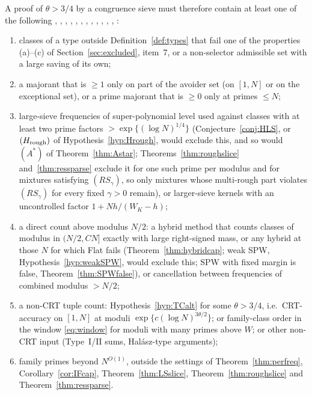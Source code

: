 \documentclass[10pt,reqno]{amsart}
\theoremstyle{definition}
\theoremstyle{remark}
\begin{document}
A proof of $\theta>3/4$ by a congruence sieve must therefore contain at
least one of the following \cite[\S6]{ET}, \cite[\S4.3]{KA},
\cite[\S6]{NC}, \cite[\S6]{KA2}, \cite[\S7]{LS}, \cite[\S0]{LS2},
\cite[\S0]{IF2}, \cite[\S0]{TU2}, \cite[\S5]{KA3}, \cite[\S4]{LS3}, \cite[\S5]{LS4},
\cite[\S4]{SPW}, \cite[\S1]{SPW2}:
\begin{enumerate}
\item[(i)] classes of a type outside Definition~\ref{def:types} that fail
  one of the properties (a)--(c) of Section~\ref{sec:excluded}, item~7,
  or a non-selector admissible set with a large saving of its own;
\item[(ii)] a majorant that is $\geq1$ only on part of the avoider set
  (on $[1,N]$ or on the exceptional set), or a prime majorant that is
  $\geq0$ only at primes $\leq N$;
\item[(iii)] large-sieve frequencies of super-polynomial level used
  against classes with at least two prime factors $>\exp\{(\log N)^{1/4}\}$
  (Conjecture~\ref{conj:HLS}, or $(H_{\rm rough})$ of Hypothesis~\ref{hyp:Hrough},
  would exclude this, and so would $(A^*)$ of Theorem~\ref{thm:Astar};
  Theorems~\ref{thm:roughslice} and~\ref{thm:ressparse} exclude it for one such
  prime per modulus and for mixtures satisfying $(RS_\gamma)$, so only mixtures
  whose multi-rough part violates $(RS_\gamma)$ for every fixed $\gamma>0$ remain), or larger-sieve kernels with an uncontrolled factor
  $1+Nh/(W_K-h)$;
\item[(iv)] a direct count above modulus $N/2$: a hybrid method that
  counts classes of modulus in $(N/2,CN]$ exactly with large right-signed
  mass, or any hybrid at those $N$ for which Flat fails
  (Theorem~\ref{thm:hybridcap}; weak SPW, Hypothesis~\ref{hyp:weakSPW}, would
  exclude this; SPW with fixed margin is false, Theorem~\ref{thm:SPWfalse}), or
  cancellation between frequencies of combined modulus $>N/2$;
\item[(v)] a non-CRT tuple count: Hypothesis~\ref{hyp:TCalt} for some
  $\theta>3/4$, i.e.\ CRT-accuracy on $[1,N]$ at moduli
  $\exp\{c(\log N)^{3\theta/2}\}$; or family-class order in the window
  \eqref{eq:window} for moduli with many primes above $W$; or other
  non-CRT input (Type~I/II sums, Hal\'asz-type arguments);
\item[(vi)] family primes beyond $N^{O(1)}$, outside the settings of
  Theorem~\ref{thm:perfreq}, Corollary~\ref{cor:IFcap},
  Theorem~\ref{thm:LSslice}, Theorem~\ref{thm:roughslice} and
  Theorem~\ref{thm:ressparse}.
\end{enumerate}
\end{document}

